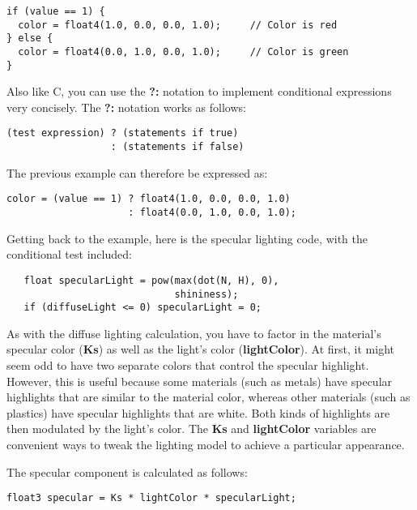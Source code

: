 \documentclass[../main.tex]{subfiles}
\begin{document}
\FloatBarrier
\begin{lstlisting}
if (value == 1) {
  color = float4(1.0, 0.0, 0.0, 1.0);     // Color is red
} else {
  color = float4(0.0, 1.0, 0.0, 1.0);     // Color is green
}
\end{lstlisting}
\FloatBarrier

Also like C, you can use the \textbf{?:} notation to implement conditional expressions very concisely. The \textbf{?:} notation works as follows:

\FloatBarrier
\begin{lstlisting}
(test expression) ? (statements if true)
                  : (statements if false)
\end{lstlisting}
\FloatBarrier

The previous example can therefore be expressed as:

\FloatBarrier
\begin{lstlisting}
color = (value == 1) ? float4(1.0, 0.0, 0.0, 1.0)
                     : float4(0.0, 1.0, 0.0, 1.0);
\end{lstlisting}
\FloatBarrier

Getting back to the example, here is the specular lighting code, with the conditional test included:

\FloatBarrier
\begin{lstlisting}
   float specularLight = pow(max(dot(N, H), 0),
                             shininess);
   if (diffuseLight <= 0) specularLight = 0;
\end{lstlisting}
\FloatBarrier

As with the diffuse lighting calculation, you have to factor in the material's specular color (\textbf{Ks}) as well as the light's color (\textbf{lightColor}). At first, it might seem odd to have two separate colors that control the specular highlight. However, this is useful because some materials (such as metals) have specular highlights that are similar to the material color, whereas other materials (such as plastics) have specular highlights that are white. Both kinds of highlights are then modulated by the light's color. The \textbf{Ks} and \textbf{lightColor} variables are convenient ways to tweak the lighting model to achieve a particular appearance.

The specular component is calculated as follows:

\FloatBarrier
\begin{lstlisting}
float3 specular = Ks * lightColor * specularLight;
\end{lstlisting}
\FloatBarrier
\end{document}
